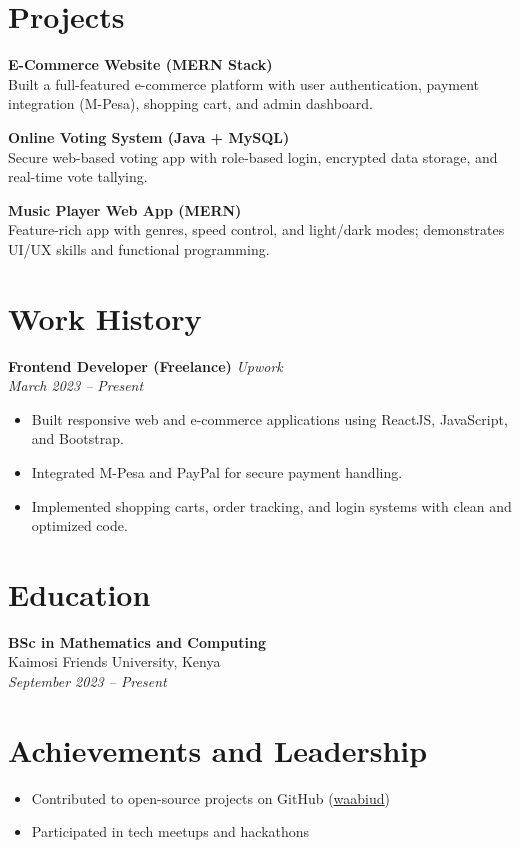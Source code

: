 \documentclass[a4paper,10pt]{article}
\begin{document}
\section*{Projects}
\textbf{E-Commerce Website (MERN Stack)} \\
Built a full-featured e-commerce platform with user authentication, payment integration (M-Pesa), shopping cart, and admin dashboard.

\textbf{Online Voting System (Java + MySQL)} \\
Secure web-based voting app with role-based login, encrypted data storage, and real-time vote tallying.

\textbf{Music Player Web App (MERN)} \\
Feature-rich app with genres, speed control, and light/dark modes; demonstrates UI/UX skills and functional programming.

\section*{Work History}
\textbf{Frontend Developer (Freelance)} \hfill \textit{Upwork} \\
\textit{March 2023 – Present}
\begin{itemize}[leftmargin=*]
    \item Built responsive web and e-commerce applications using ReactJS, JavaScript, and Bootstrap.
    \item Integrated M-Pesa and PayPal for secure payment handling.
    \item Implemented shopping carts, order tracking, and login systems with clean and optimized code.
\end{itemize}

\section*{Education}
\textbf{BSc in Mathematics and Computing} \\
Kaimosi Friends University, Kenya \\
\textit{September 2023 – Present}

\section*{Achievements and Leadership}
\begin{itemize}[leftmargin=*]
    \item Contributed to open-source projects on GitHub (\href{https://github.com/waabiud}{waabiud})
    \item Participated in tech meetups and hackathons
\end{itemize}
\end{document}
